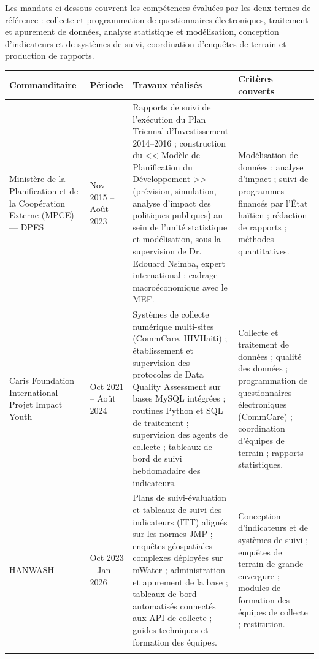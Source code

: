 \documentclass[11pt,a4paper]{article}
\begin{document}
Les mandats ci-dessous couvrent les compétences évaluées par les deux termes de référence :
collecte et programmation de questionnaires électroniques, traitement et apurement de données,
analyse statistique et modélisation, conception d'indicateurs et de systèmes de suivi,
coordination d'enquêtes de terrain et production de rapports.

\vspace{4pt}
\begin{longtable}{L{3.4cm} L{2.5cm} L{5.4cm} L{5.4cm}}
\toprule
\textbf{Commanditaire} & \textbf{Période} & \textbf{Travaux réalisés} & \textbf{Critères couverts} \\
\midrule
\endhead

Ministère de la Planification et de la Coopération Externe (MPCE) --- DPES
& Nov 2015 -- Août 2023
& Rapports de suivi de l'exécution du Plan Triennal d'Investissement 2014--2016 ; construction du
<< Modèle de Planification du Développement >> (prévision, simulation, analyse d'impact des
politiques publiques) au sein de l'unité statistique et modélisation, sous la supervision de
Dr. Edouard Nsimba, expert international ; cadrage macroéconomique avec le MEF.
& Modélisation de données ; analyse d'impact ; suivi de programmes financés par l'État haïtien ;
rédaction de rapports ; méthodes quantitatives. \\
\addlinespace

Caris Foundation International --- Projet Impact Youth
& Oct 2021 -- Août 2024
& Systèmes de collecte numérique multi-sites (CommCare, HIVHaiti) ; établissement et supervision
des protocoles de Data Quality Assessment sur bases MySQL intégrées ; routines Python et SQL de
traitement ; supervision des agents de collecte ; tableaux de bord de suivi hebdomadaire des
indicateurs.
& Collecte et traitement de données ; qualité des données ; programmation de questionnaires
électroniques (CommCare) ; coordination d'équipes de terrain ; rapports statistiques. \\
\addlinespace

HANWASH
& Oct 2023 -- Jan 2026
& Plans de suivi-évaluation et tableaux de suivi des indicateurs (ITT) alignés sur les normes JMP ;
enquêtes géospatiales complexes déployées sur mWater ; administration et apurement de la base ;
tableaux de bord automatisés connectés aux API de collecte ; guides techniques et formation des
équipes.
& Conception d'indicateurs et de systèmes de suivi ; enquêtes de terrain de grande envergure ;
modules de formation des équipes de collecte ; restitution. \\
\addlinespace


\end{longtable}
\end{document}
